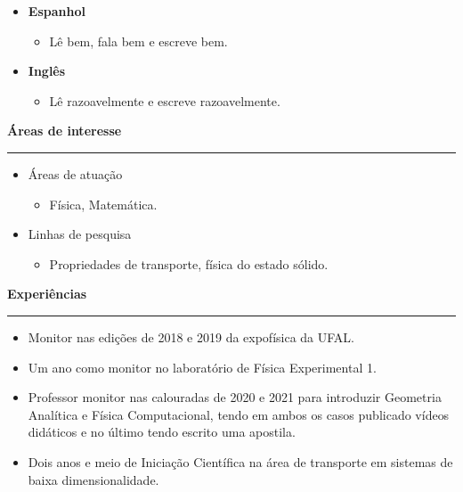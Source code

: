 \documentclass[
   12pt,                         %
   a4paper,                      %
   spanish,                      %
   brazil,                       %
   xcolor=table                  %
]{abntex2}
\newcommand{\customtitle}[1]{\noindent\textbf{\large#1}\vspace{2pt}\hrule}
\begin{document}
   \begin{itemize}[nosep]

      \item[ ] \textbf{Espanhol}
      \begin{itemize}[nosep]
        \item[ ] Lê bem, fala bem e escreve bem.
      \end{itemize}
      \item[ ] \textbf{Inglês}


      \begin{itemize}[nosep]
        \item[ ] Lê razoavelmente e escreve razoavelmente.
      \end{itemize}

   \end{itemize}

\customtitle{Áreas de interesse}

   \begin{itemize}[nosep]

      \item[ ] Áreas de atuação
      \begin{itemize}[nosep]
        \item[ ] Física, Matemática.
      \end{itemize}


      \item[ ] Linhas de pesquisa
      \begin{itemize}[nosep]
        \item[ ] Propriedades de transporte, física do estado sólido.
      \end{itemize}

   \end{itemize}

\customtitle{Experiências}

   \begin{itemize}[nosep]
      \item Monitor nas edições de 2018 e 2019 da expofísica da UFAL.
      \item Um ano como monitor no laboratório de Física Experimental 1.
      \item Professor monitor nas calouradas de 2020 e 2021 para introduzir
      Geometria Analítica e Física Computacional,
      tendo em ambos os casos publicado vídeos didáticos e no último
      tendo escrito uma apostila.
      \item Dois anos e meio de Iniciação Científica na área de
      transporte em sistemas de baixa dimensionalidade.
   \end{itemize}
\end{document}
